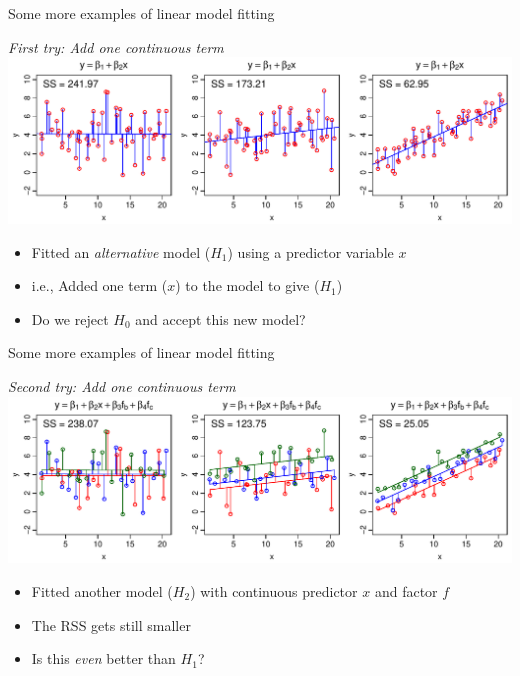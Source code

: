 \documentclass[xcolor=x11names,compress]{beamer}
\renewcommand{\(}{\begin{columns}}
\renewcommand{\)}{\end{columns}}
\newcommand{\<}[1]{\begin{column}{#1}}
\renewcommand{\>}{\end{column}}
\begin{document}
\begin{frame}{Some more examples of linear model fitting}

    \begin{center}
        {\it First try: Add one continuous term}\\

        \includegraphics[width=\textwidth]{ANOVA_mod.pdf}
    \end{center}

\begin{itemize}[<+->]\itemsep10pt
\item Fitted an {\it alternative} model ($H_1$) using a predictor variable $x$
\item i.e., Added one term ($x$) to the model to give ($H_1$)
\item Do we reject $H_0$ and accept this new model?
\end{itemize}

\end{frame}


\begin{frame}{Some more examples of linear model fitting}

    \begin{center}
        {\it Second try: Add one continuous term}\\

        \includegraphics[width=\textwidth]{ANOVA_mod2.pdf}
    \end{center}

\begin{itemize}[<+->]\itemsep6pt
    \item Fitted another model ($H_2$) with continuous predictor $x$ and factor $f$
    \item The RSS gets still smaller 
    \item Is this {\it even} better than $H_1$?
\end{itemize}


\end{frame}
\end{document}
